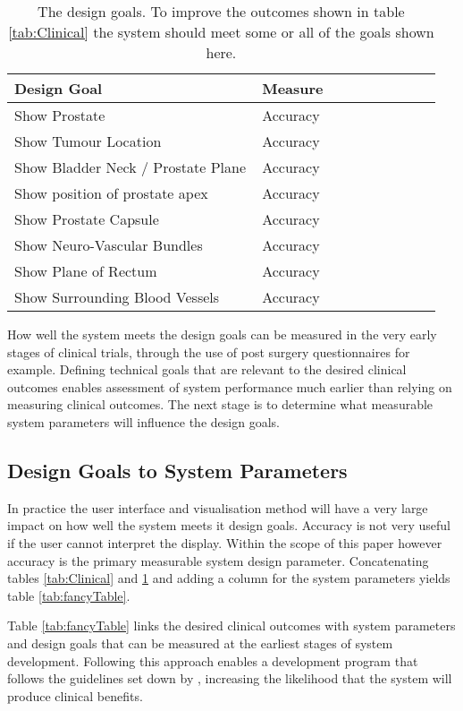 \documentclass[3p,twocolumn,preprint,10pt]{elsarticle}
\begin{document}
\begin{table}
\begin{tabular}{|p{0.55\linewidth}|p{0.4\linewidth}|} \hline
Design Goal & Measure \\ \hline
Show Prostate & Accuracy \\
Show Tumour Location  &  Accuracy \\
Show Bladder Neck / Prostate Plane &  Accuracy \\
Show position of prostate apex & Accuracy \\
Show Prostate Capsule &  Accuracy \\
Show Neuro-Vascular Bundles& Accuracy \\
Show Plane of Rectum &  Accuracy \\
Show Surrounding Blood Vessels & Accuracy \\ \hline
\end{tabular}
\caption{\label{tab:Goals}The design goals. To improve the outcomes shown in
table \ref{tab:Clinical} the system should meet some or all of the goals shown here.}
\end{table}
How well the system meets the design goals can be measured in the very early stages
of clinical trials, through 
the use of post surgery questionnaires for example. Defining technical goals that 
are relevant to the desired clinical outcomes 
enables assessment of system performance much earlier than 
relying on measuring clinical outcomes. The next stage is to 
determine what measurable system parameters will influence the design goals.
\subsection{Design Goals to System Parameters}
In practice the user interface and visualisation method will have a very large 
impact on how well the system meets it design goals. Accuracy is not very useful if
the user cannot interpret the display. Within the scope of this paper however 
accuracy is the primary measurable system design parameter. Concatenating tables 
\ref{tab:Clinical} and \ref{tab:Goals} and adding a column for the system parameters 
yields table \ref{tab:fancyTable}. 
%

Table \ref{tab:fancyTable} links the desired clinical outcomes with system parameters and
design goals that can be measured at the earliest stages of system development. Following this
approach enables a development program that follows the guidelines set down by \cite{pap264},
increasing the likelihood that the system will produce clinical benefits.
\end{document}

